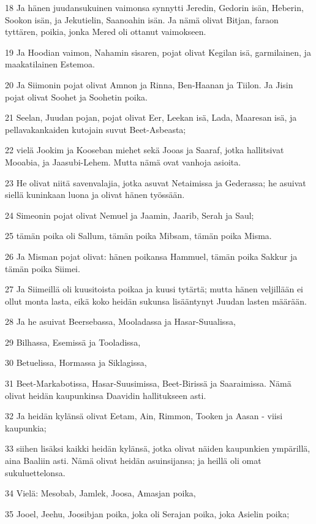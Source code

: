 \par 18 Ja hänen juudansukuinen vaimonsa synnytti Jeredin, Gedorin isän, Heberin, Sookon isän, ja Jekutielin, Saanoahin isän. Ja nämä olivat Bitjan, faraon tyttären, poikia, jonka Mered oli ottanut vaimokseen.
\par 19 Ja Hoodian vaimon, Nahamin sisaren, pojat olivat Kegilan isä, garmilainen, ja maakatilainen Estemoa.
\par 20 Ja Siimonin pojat olivat Amnon ja Rinna, Ben-Haanan ja Tiilon. Ja Jisin pojat olivat Soohet ja Soohetin poika.
\par 21 Seelan, Juudan pojan, pojat olivat Eer, Leekan isä, Lada, Maaresan isä, ja pellavakankaiden kutojain suvut Beet-Asbeasta;
\par 22 vielä Jookim ja Kooseban miehet sekä Jooas ja Saaraf, jotka hallitsivat Mooabia, ja Jaasubi-Lehem. Mutta nämä ovat vanhoja asioita.
\par 23 He olivat niitä savenvalajia, jotka asuvat Netaimissa ja Gederassa; he asuivat siellä kuninkaan luona ja olivat hänen työssään.
\par 24 Simeonin pojat olivat Nemuel ja Jaamin, Jaarib, Serah ja Saul;
\par 25 tämän poika oli Sallum, tämän poika Mibsam, tämän poika Misma.
\par 26 Ja Misman pojat olivat: hänen poikansa Hammuel, tämän poika Sakkur ja tämän poika Siimei.
\par 27 Ja Siimeillä oli kuusitoista poikaa ja kuusi tytärtä; mutta hänen veljillään ei ollut monta lasta, eikä koko heidän sukunsa lisääntynyt Juudan lasten määrään.
\par 28 Ja he asuivat Beersebassa, Mooladassa ja Hasar-Suualissa,
\par 29 Bilhassa, Esemissä ja Tooladissa,
\par 30 Betuelissa, Hormassa ja Siklagissa,
\par 31 Beet-Markabotissa, Hasar-Suusimissa, Beet-Birissä ja Saaraimissa. Nämä olivat heidän kaupunkinsa Daavidin hallitukseen asti.
\par 32 Ja heidän kylänsä olivat Eetam, Ain, Rimmon, Tooken ja Aasan - viisi kaupunkia;
\par 33 siihen lisäksi kaikki heidän kylänsä, jotka olivat näiden kaupunkien ympärillä, aina Baaliin asti. Nämä olivat heidän asuinsijansa; ja heillä oli omat sukuluettelonsa.
\par 34 Vielä: Mesobab, Jamlek, Joosa, Amasjan poika,
\par 35 Jooel, Jeehu, Joosibjan poika, joka oli Serajan poika, joka Asielin poika;
